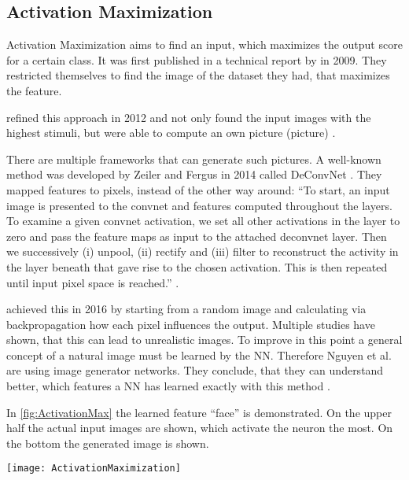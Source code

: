 \subsection{Activation Maximization}
Activation Maximization aims to find an input, which maximizes the output score for a certain class. It was first published in a technical report by  in 2009. They restricted themselves to find the image of the dataset they had, that maximizes the feature.
\par
{} refined this approach in 2012 and not only found the input images with the highest stimuli, but were able to compute an own picture (picture) \cite{Le.2012}.
\par
There are multiple frameworks that can generate such pictures. A well-known method was developed by Zeiler and Fergus in 2014 called DeConvNet \cite{Zeiler.2014}. They mapped features to pixels, instead of the other way around:
“To start, an input image is presented to the convnet and features computed throughout the layers. To examine a given convnet activation, we set all other activations in the layer to zero and pass the feature maps as input to the attached deconvnet layer. Then we successively (i) unpool, (ii) rectify and (iii) filter to reconstruct the activity in the layer beneath that gave rise to the chosen activation. This is then repeated until input pixel space is reached.” \cite[820]{Zeiler.2014}.
\par
{} achieved this in 2016 by starting from a random image and calculating via backpropagation how each pixel influences the output. Multiple studies have shown, that this can lead to unrealistic images. To improve in this point a general concept of a natural image must be learned by the NN. Therefore Nguyen et al. are using image generator networks. They conclude, that they can understand better, which features a NN has learned exactly with this method \cite{Nguyen.2016}. 
\par
In \cref{fig:ActivationMax} the learned feature “face” is demonstrated. On the upper half the actual input images are shown, which activate the neuron the most. On the bottom the generated image is shown.
\begin{figure*}[h]
    \center
    \texttt{[image: ActivationMaximization]}
    \caption{Inputs, that activate the “face-neuron” the most.
    Top: actual input images 
    Bottom: via backpropagation found input, \cite{Le.2012}}
    \label{fig:ActivationMax}
\end{figure*}
